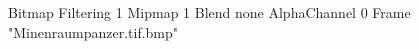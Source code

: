 {Bitmap
	{Filtering 1}
	{Mipmap 1}
	{Blend none}
	{AlphaChannel 0}
	{Frame "Minenraumpanzer.tif.bmp"}
}
